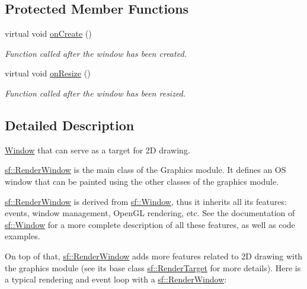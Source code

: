 \subsection*{Protected Member Functions}
\begin{DoxyCompactItemize}
\item 
virtual void \hyperlink{classsf_1_1_render_window_a5bef0040b0fa87bed9fbd459c980d53a}{on\+Create} ()
\begin{DoxyCompactList}\small\item\em Function called after the window has been created. \end{DoxyCompactList}\item 
virtual void \hyperlink{classsf_1_1_render_window_a5c85fe482313562d33ffd24a194b6fef}{on\+Resize} ()
\begin{DoxyCompactList}\small\item\em Function called after the window has been resized. \end{DoxyCompactList}\end{DoxyCompactItemize}


\subsection{Detailed Description}
\hyperlink{classsf_1_1_window}{Window} that can serve as a target for 2D drawing. 

\hyperlink{classsf_1_1_render_window}{sf\+::\+Render\+Window} is the main class of the Graphics module. It defines an OS window that can be painted using the other classes of the graphics module.

\hyperlink{classsf_1_1_render_window}{sf\+::\+Render\+Window} is derived from \hyperlink{classsf_1_1_window}{sf\+::\+Window}, thus it inherits all its features\+: events, window management, Open\+GL rendering, etc. See the documentation of \hyperlink{classsf_1_1_window}{sf\+::\+Window} for a more complete description of all these features, as well as code examples.

On top of that, \hyperlink{classsf_1_1_render_window}{sf\+::\+Render\+Window} adds more features related to 2D drawing with the graphics module (see its base class \hyperlink{classsf_1_1_render_target}{sf\+::\+Render\+Target} for more details). Here is a typical rendering and event loop with a \hyperlink{classsf_1_1_render_window}{sf\+::\+Render\+Window}\+:


